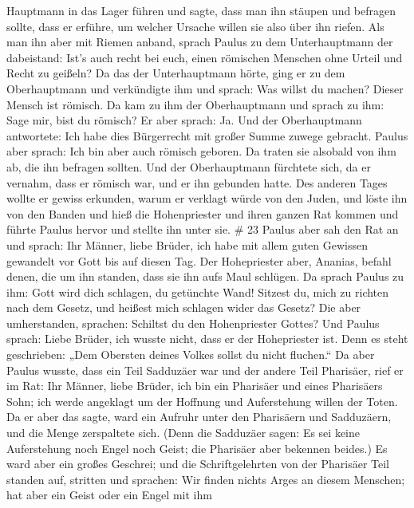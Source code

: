 Hauptmann in das Lager führen und sagte, dass man ihn stäupen und
befragen sollte, dass er erführe, um welcher Ursache willen sie also
über ihn riefen.  Als man ihn aber mit Riemen anband,
sprach Paulus zu dem Unterhauptmann der dabeistand: Ist's auch recht bei
euch, einen römischen Menschen ohne Urteil und Recht zu geißeln?
 Da das der Unterhauptmann hörte, ging er zu dem
Oberhauptmann und verkündigte ihm und sprach: Was willst du machen?
Dieser Mensch ist römisch.  Da kam zu ihm der Oberhauptmann
und sprach zu ihm: Sage mir, bist du römisch? Er aber sprach: Ja.
 Und der Oberhauptmann antwortete: Ich habe dies
Bürgerrecht mit großer Summe zuwege gebracht. Paulus aber sprach: Ich
bin aber auch römisch geboren.  Da traten sie alsobald von
ihm ab, die ihn befragen sollten. Und der Oberhauptmann fürchtete sich,
da er vernahm, dass er römisch war, und er ihn gebunden hatte.
 Des anderen Tages wollte er gewiss erkunden, warum er
verklagt würde von den Juden, und löste ihn von den Banden und hieß die
Hohenpriester und ihren ganzen Rat kommen und führte Paulus hervor und
stellte ihn unter sie. \# 23  Paulus aber sah den Rat an und
sprach: Ihr Männer, liebe Brüder, ich habe mit allem guten Gewissen
gewandelt vor Gott bis auf diesen Tag.  Der Hohepriester
aber, Ananias, befahl denen, die um ihn standen, dass sie ihn aufs Maul
schlügen.  Da sprach Paulus zu ihm: Gott wird dich schlagen,
du getünchte Wand! Sitzest du, mich zu richten nach dem Gesetz, und
heißest mich schlagen wider das Gesetz?  Die aber
umherstanden, sprachen: Schiltst du den Hohenpriester Gottes?
 Und Paulus sprach: Liebe Brüder, ich wusste nicht, dass er
der Hohepriester ist. Denn es steht geschrieben: „Dem Obersten deines
Volkes sollst du nicht fluchen.``  Da aber Paulus wusste,
dass ein Teil Sadduzäer war und der andere Teil Pharisäer, rief er im
Rat: Ihr Männer, liebe Brüder, ich bin ein Pharisäer und eines
Pharisäers Sohn; ich werde angeklagt um der Hoffnung und Auferstehung
willen der Toten.  Da er aber das sagte, ward ein Aufruhr
unter den Pharisäern und Sadduzäern, und die Menge zerspaltete sich.
 (Denn die Sadduzäer sagen: Es sei keine Auferstehung noch
Engel noch Geist; die Pharisäer aber bekennen beides.)  Es
ward aber ein großes Geschrei; und die Schriftgelehrten von der
Pharisäer Teil standen auf, stritten und sprachen: Wir finden nichts
Arges an diesem Menschen; hat aber ein Geist oder ein Engel mit ihm
